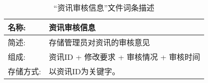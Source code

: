 \begin{table}[H]  
\caption{“资讯审核信息”文件词条描述}  
\begin{center}  
    \begin{tabular}{l p{10cm}} 
        \hline
        \quad 名称:  &  资讯审核信息 \\
        \hline
        \quad 简述:  & 存储管理员对资讯的审核意见 \\
        \hline
        \quad 组成:  & 资讯ID + 修改要求 + 审核情况 + 审核时间 \\
        \hline
        \quad 存储方式:  & 以资讯ID为关键字。 \\
        \hline
    \end{tabular}
    \label{tab1}
\end{center}
\end{table}
